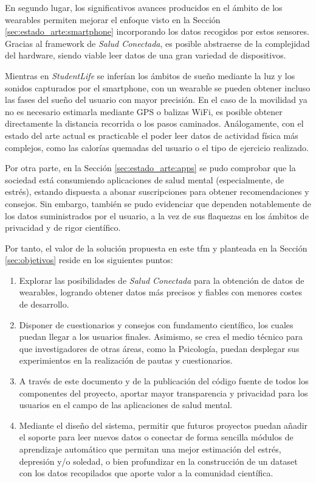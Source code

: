     En segundo lugar, los significativos avances producidos en el ámbito de los \glspl{wearable} permiten mejorar el enfoque visto en la Sección \ref{sec:estado_arte:smartphone} incorporando los datos recogidos por estos sensores. Gracias al \gls{framework} de \textit{Salud Conectada}, es posible abstraerse de la complejidad del hardware, siendo viable leer datos de una gran variedad de dispositivos.
    
    Mientras en \textit{StudentLife} se inferían los ámbitos de sueño mediante la luz y los sonidos capturados por el \gls{smartphone}, con un \gls{wearable} se pueden obtener incluso las fases del sueño del usuario con mayor precisión. En el caso de la movilidad ya no es necesario estimarla mediante GPS o balizas WiFi, es posible obtener directamente la distancia recorrida o los pasos caminados. Análogamente, con el estado del arte actual es practicable el poder leer datos de actividad física más complejos, como las calorías quemadas del usuario o el tipo de ejercicio realizado.

    Por otra parte, en la Sección \ref{sec:estado_arte:apps} se pudo comprobar que la sociedad está consumiendo aplicaciones de salud mental (especialmente, de estrés), estando dispuesta a abonar suscripciones para obtener recomendaciones y consejos. Sin embargo, también se pudo evidenciar que dependen notablemente de los datos suministrados por el usuario, a la vez de sus flaquezas en los ámbitos de privacidad y de rigor científico.

    Por tanto, el valor de la solución propuesta en este \gls{tfm} y planteada en la Sección \ref{sec:objetivos} reside en los siguientes puntos:

    \begin{enumerate}
        \item Explorar las posibilidades de \textit{Salud Conectada} para la obtención de datos de \glspl{wearable}, logrando obtener datos más precisos y fiables con menores costes de desarrollo.
        \item Disponer de cuestionarios y consejos con fundamento científico, los cuales puedan llegar a los usuarios finales. Asimismo, se crea el medio técnico para que investigadores de otras áreas, como la Psicología, puedan desplegar sus experimientos en la realización de pautas y cuestionarios.
        \item A través de este documento y de la publicación del código fuente de todos los componentes del proyecto, aportar mayor transparencia y privacidad para los usuarios en el campo de las aplicaciones de salud mental.
        \item Mediante el diseño del sistema, permitir que futuros proyectos puedan añadir el soporte para leer nuevos datos o conectar de forma sencilla módulos de aprendizaje automático que permitan una mejor estimación del estrés, depresión y/o soledad, o bien profundizar en la construcción de un \gls{dataset} con los datos recopilados que aporte valor a la comunidad científica.
    \end{enumerate}

